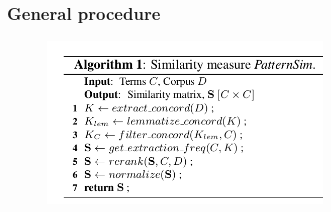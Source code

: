 \documentclass{beamer}
\begin{document}
\begin{frame}
\frametitle{General procedure}

\begin{figure}	
	\centering
		\includegraphics[width=0.65\textwidth]{figures/algo}
\end{figure}

\end{frame}









 





\end{document}
